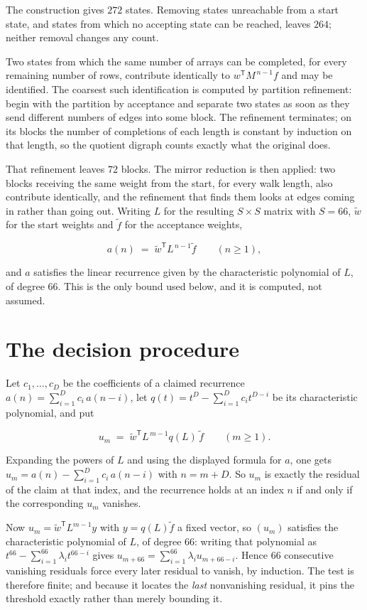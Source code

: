 \documentclass[11pt]{article}
\theoremstyle{definition}
\begin{document}
The construction gives $272$ states. Removing states unreachable from a start state, and states from which no accepting state can be reached, leaves $264$; neither removal changes any count.

Two states from which the same number of arrays can be completed, for every remaining number of rows, contribute identically to $w^{\mathsf T}M^{\,n-1}f$ and may be identified. The coarsest such identification is computed by partition refinement: begin with the partition by acceptance and separate two states as soon as they send different numbers of edges into some block. The refinement terminates; on its blocks the number of completions of each length is constant by induction on that length, so the quotient digraph counts exactly what the original does.

That refinement leaves $72$ blocks. The mirror reduction is then applied: two blocks receiving the same weight from the start, for every walk length, also contribute identically, and the refinement that finds them looks at edges coming in rather than going out. Writing $L$ for the resulting $S \times S$ matrix with $S = 66$, $\tilde w$ for the start weights and $\tilde f$ for the acceptance weights,

\[a(n) \;=\; \tilde w^{\mathsf T} L^{\,n-1} \tilde f \qquad (n \ge 1),\]

and $a$ satisfies the linear recurrence given by the characteristic polynomial of $L$, of degree $66$. This is the only bound used below, and it is computed, not assumed.

\section{The decision procedure}

Let $c_1,\dots,c_D$ be the coefficients of a claimed recurrence $a(n) = \sum_{i=1}^{D} c_i\,a(n-i)$, let $q(t) = t^{D} - \sum_{i=1}^{D} c_i t^{D-i}$ be its characteristic polynomial, and put

\[u_m \;=\; \tilde w^{\mathsf T} L^{\,m-1} q(L)\,\tilde f \qquad (m \ge 1).\]

Expanding the powers of $L$ and using the displayed formula for $a$, one gets $u_m = a(n) - \sum_{i=1}^{D} c_i\,a(n-i)$ with $n = m + D$. So $u_m$ is exactly the residual of the claim at that index, and the recurrence holds at an index $n$ if and only if the corresponding $u_m$ vanishes.

Now $u_m = \tilde w^{\mathsf T} L^{m-1} y$ with $y = q(L)\tilde f$ a fixed vector, so $(u_m)$ satisfies the characteristic polynomial of $L$, of degree $66$: writing that polynomial as $t^{66} - \sum_{i=1}^{66} \lambda_i t^{66-i}$ gives $u_{m+66} = \sum_{i=1}^{66} \lambda_i u_{m+66-i}$. Hence $66$ consecutive vanishing residuals force every later residual to vanish, by induction. The test is therefore finite; and because it locates the {\itshape last} nonvanishing residual, it pins the threshold exactly rather than merely bounding it.
\end{document}
